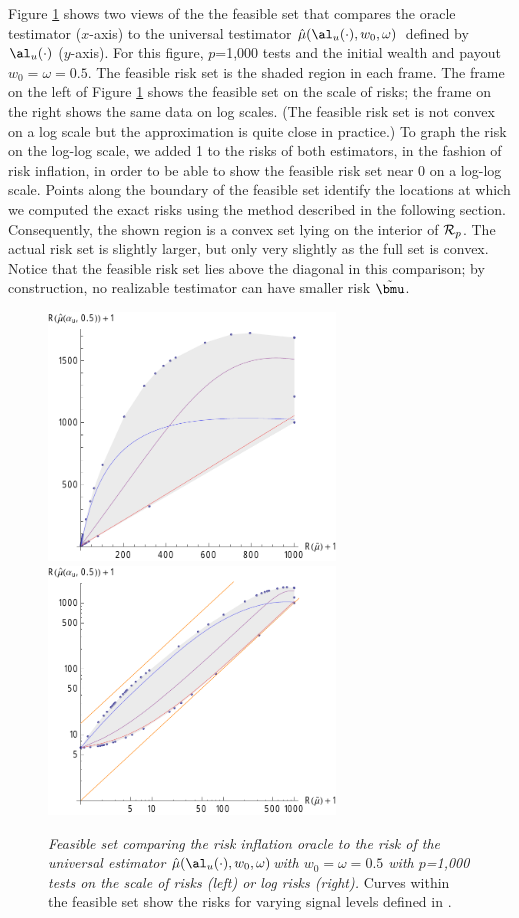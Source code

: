 \documentclass[12pt]{article}
\newcommand{\uTest}{\mbox{$\hat\mu(\al_u(\cdot),w_0,\omega)$}}
\begin{document}
 Figure \ref{fig:riFeasibleSet} shows two views of the the feasible set that
 compares the oracle testimator ($x$-axis) to the universal testimator
 \uTest\ defined by $\al_u(\cdot)$ ($y$-axis).  For this figure, $p$=1,000 tests
 and the initial wealth and payout $w_0 = \omega = 0.5$.  The feasible risk set
 is the shaded region in each frame.  The frame on the left of Figure
 \ref{fig:riFeasibleSet} shows the feasible set on the scale of risks; the frame
 on the right shows the same data on log scales.  (The feasible risk set is not
 convex on a log scale but the approximation is quite close in practice.) To
 graph the risk on the log-log scale, we added 1 to the risks of both
 estimators, in the fashion of risk inflation, in order to be able to show the
 feasible risk set near 0 on a log-log scale.  Points along the boundary of the
 feasible set identify the locations at which we computed the exact risks using
 the method described in the following section.  Consequently, the shown region
 is a convex set lying on the interior of ${\cal R}_p$.  The actual risk set is
 slightly larger, but only very slightly as the full set is convex.  Notice that
 the feasible risk set lies above the diagonal in this comparison; by
 construction, no realizable testimator can have smaller risk $\tilde{\bmu}$.


 \begin{figure}
 \caption{ \label{fig:riFeasibleSet} {\sl Feasible set comparing the risk
 inflation oracle to the risk of the universal estimator \uTest with
 $w_0=\omega=0.5$ with $p$=1,000 tests on the scale of risks (left) or log risks
 (right).}  Curves within the feasible set show the risks for varying signal
 levels defined in . }

 \vspace{0.1in}
\centerline{
 \includegraphics[width=3.0in]{figures/riFeasSet}
 \includegraphics[width=3.0in]{figures/riFeasSetLog} }
 \vspace{0.2in}
 \end{figure}
\end{document}
